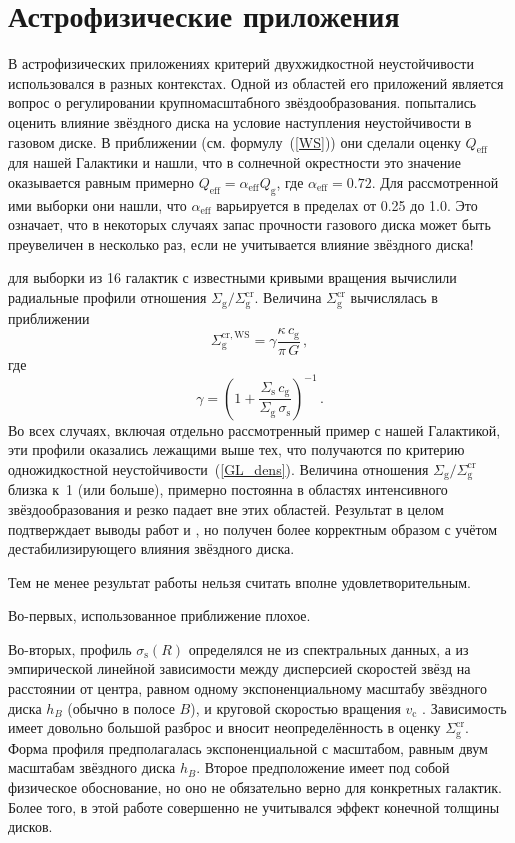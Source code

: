 \documentclass[russian,12pt]{article}
\def\be{\begin{equation}}
\def\ee{\end{equation}}
\begin{document}
\section{Астрофизические приложения}

В астрофизических приложениях критерий двухжидкостной неустойчивости 
использовался в разных контекстах. Одной из областей его приложений 
является вопрос о регулировании крупномасштабного звёздообразования. 
\cite{MK01} попытались оценить влияние звёздного диска на условие 
наступления неустойчивости в газовом диске. В приближении \cite{WS94} 
(см. формулу~(\ref{WS})) они сделали оценку $Q_\mathrm{eff}$ для нашей 
Галактики и нашли, что в солнечной окрестности это значение оказывается 
равным примерно $Q_\mathrm{eff} = \alpha_\mathrm{eff} Q_\mathrm{g}$, 
где $\alpha_\mathrm{eff} = 0.72$. Для рассмотренной ими выборки они 
нашли, что $\alpha_\mathrm{eff}$ варьируется в пределах от 0.25 до 1.0. 
Это означает, что в некоторых случаях запас прочности газового диска 
может быть преувеличен в несколько раз, если не учитывается влияние 
звёздного диска!

\cite{Boissier+03} для выборки из 16 галактик с известными кривыми 
вращения вычислили радиальные профили отношения 
$\Sigma_\mathrm{g} / \Sigma_\mathrm{g}^\mathrm{cr}$. 
Величина $\Sigma_\mathrm{g}^\mathrm{cr}$ вычислялась в приближении 
\cite{WS94}
\be
\Sigma_\mathrm{g}^\mathrm{cr,WS} = \gamma 
\frac{\kappa \, c_\mathrm{g}}{\pi \, G} \, ,
\label{B03}
\ee
где
$$
\gamma = \left( 
1 + 
\frac{\Sigma_\mathrm{s}\,c_\mathrm{g}}{\Sigma_\mathrm{g}\,\sigma_\mathrm{s}} 
\right)^{-1} \, .
$$
Во всех случаях, включая отдельно рассмотренный пример с нашей Галактикой, эти 
профили оказались лежащими выше тех, что получаются по критерию 
одножидкостной неустойчивости~(\ref{GL_dens}). Величина отношения 
$\Sigma_\mathrm{g} / \Sigma_\mathrm{g}^\mathrm{cr}$ близка к~1 (или 
больше), примерно постоянна в областях интенсивного звёздообразования и 
резко падает вне этих областей. Результат в целом подтверждает выводы 
работ \cite{Kennicutt89} и \cite{MK01}, но получен более корректным 
образом с учётом дестабилизирующего влияния звёздного диска.

Тем не менее результат работы \cite{Boissier+03} нельзя считать вполне 
удовлетворительным. 

Во-первых, использованное приближение \cite{WS94} плохое. 

Во-вторых, профиль $\sigma_\mathrm{s}(R)$ определялся не из спектральных 
данных, а из эмпирической линейной зависимости между дисперсией скоростей 
звёзд на расстоянии от центра, равном одному экспоненциальному масштабу 
звёздного диска $h_B$ (обычно в полосе $B$), и круговой скоростью вращения 
$v_\mathrm{c}$ \citep{Bottema93}. Зависимость имеет довольно большой 
разброс и вносит неопределённость в оценку 
$\Sigma_\mathrm{g}^\mathrm{cr}$. Форма профиля предполагалась 
экспоненциальной с масштабом, равным двум масштабам звёздного диска 
$h_B$. Второе предположение имеет под собой физическое обоснование, но 
оно не обязательно верно для конкретных галактик. Более того, в этой 
работе совершенно не учитывался эффект конечной толщины дисков.
\end{document}
